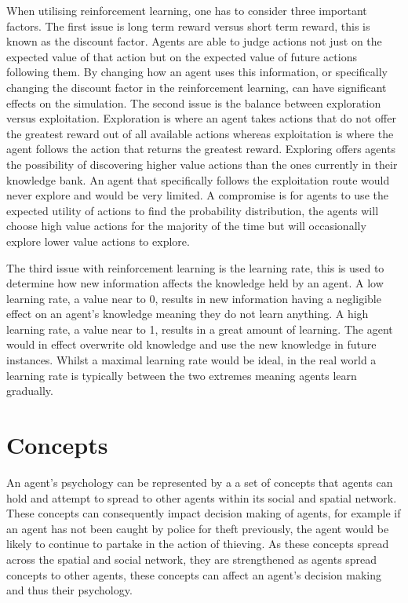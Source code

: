 \documentclass[11pt]{informatics-report}
\begin{document}
When utilising reinforcement learning, one has to consider three important factors. The first issue is long term reward versus short term reward, this is known as the discount factor. Agents are able to judge actions not just on the expected value of that action but on the expected value of future actions following them. By changing how an agent uses this information, or specifically changing the discount factor in the reinforcement learning, can have significant effects on the simulation. The second issue is the balance between exploration versus exploitation. Exploration is where an agent takes actions that do not offer the greatest reward out of all available actions whereas exploitation is where the agent follows the action that returns the greatest reward. Exploring offers agents the possibility of discovering higher value actions than the ones currently in their knowledge bank. An agent that specifically follows the exploitation route would never explore and would be very limited. A compromise is for agents to use the expected utility of actions to find the probability distribution, the agents will choose high value actions for the majority of the time but will occasionally explore lower value actions to explore.

The third issue with reinforcement learning is the learning rate, this is used to determine how new information affects the knowledge held by an agent. A low learning rate, a value near to 0, results in new information having a negligible effect on an agent's knowledge meaning they do not learn anything. A high learning rate, a value near to 1, results in a great amount of learning. The agent would in effect overwrite old knowledge and use the new knowledge in future instances. Whilst a maximal learning rate would be ideal, in the real world a learning rate is typically between the two extremes meaning agents learn gradually. 

\section{Concepts}
An agent's psychology can be represented by a a set of concepts that agents can hold and attempt to spread to other agents within its social and spatial network. These concepts can consequently impact decision making of agents, for example if an agent has not been caught by police for theft previously, the agent would be likely to continue to partake in the action of thieving. As these concepts spread across the spatial and social network, they are strengthened as agents spread concepts to other agents, these concepts can affect an agent's decision making and thus their psychology. \par
\end{document}
